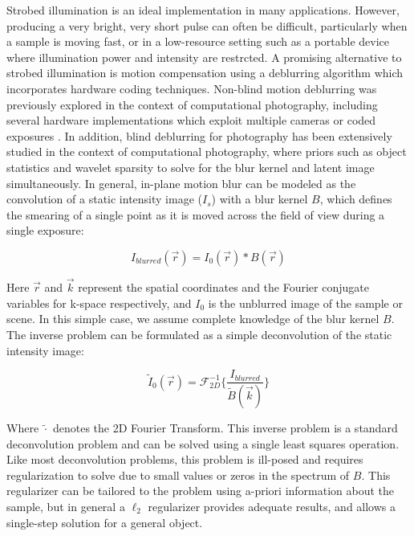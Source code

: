 Strobed illumination is an ideal implementation in many applications. However, producing a very bright, very short pulse can often be difficult, particularly when a sample is moving fast, or in a low-resource setting such as a portable device where illumination power and intensity are restrcted. A promising alternative to strobed illumination is motion compensation using a deblurring algorithm which incorporates hardware coding techniques. Non-blind motion deblurring was previously explored in the context of computational photography, including several hardware implementations which exploit multiple cameras \cite{nayarDeblur, CaiDeblurring} or coded exposures \cite{raskar2006coded}. In addition, blind deblurring for photography has been extensively studied in the context of computational photography, where priors such as object statistics \cite{fergus2006removing, Shan:2008:HMD:1360612.1360672,Cho:2009:FMD:1618452.1618491,levin2006blind} and wavelet sparsity \cite{caiWavelet} to solve for the blur kernel and latent image simultaneously. In general, in-plane motion blur can be modeled as the convolution of a static intensity image ($I_s$) with a blur kernel $B$, which defines the smearing of a single point as it is moved across the field of view during a single exposure:

\begin{equation}\label{blurForwardModel}
I_{blurred}  (\vec{r})= I_0(\vec{r}) *  B(\vec{r})
\end{equation}

Here $\vec{r}$ and $\vec{k}$ represent the spatial coordinates and the Fourier conjugate variables for k-space respectively, and $I_0$ is the unblurred image of the sample or scene. In this simple case, we assume complete knowledge of the blur kernel $B$. The inverse problem can be formulated as a simple deconvolution of the static intensity image:

\begin{equation}\label{eq:blurInverseModel}
\tilde I_0 (\vec{r}) = \mathscr{F}^{-1}_{2D} \{\frac{I_{blurred}}{ \tilde{B}(\vec{k})}\}
\end{equation}

Where $\tilde{\cdot}$ denotes the 2D Fourier Transform. This inverse problem is a standard deconvolution problem and can be solved using a single least squares operation. Like most deconvolution problems, this problem is ill-posed and requires regularization to solve due to small values or zeros in the spectrum of $B$. This regularizer can be tailored to the problem using a-priori information about the sample, but in general a $\ell_2$ regularizer provides adequate results, and allows a single-step solution for a general object.

